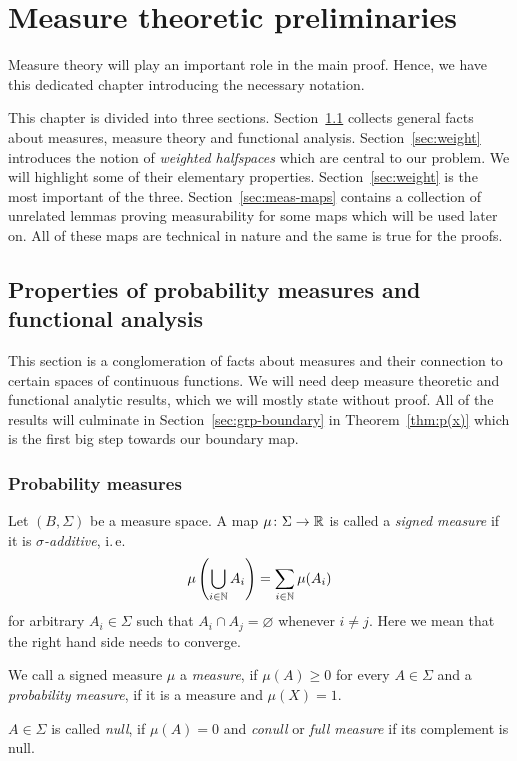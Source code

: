 \section{Measure theoretic preliminaries}
\label{sec:measure}

Measure theory will play an important role in the main proof. Hence, we have this dedicated chapter introducing the necessary notation.

This chapter is divided into three sections. Section~\ref{sec:prob} collects general facts about measures, measure theory and functional analysis.
Section~\ref{sec:weight} introduces the notion of \emph{weighted halfspaces} which are central to our problem. We will highlight some of their elementary properties. Section~\ref{sec:weight} is the most important of the three.
Section~\ref{sec:meas-maps} contains a collection of unrelated lemmas proving measurability for some maps which will be used later on. All of these maps are technical in nature and the same is true for the proofs.
\subsection{Properties of probability measures and functional analysis}
\label{sec:prob}

This section is a conglomeration of facts about measures and their connection to certain spaces of continuous functions. We will need deep measure theoretic and functional analytic results, which we will mostly state without proof. All of the results will culminate in Section~\ref{sec:grp-boundary} in Theorem~\ref{thm:p(x)} which is the first big step towards our boundary map.

\subsubsection*{Probability measures}
\label{sec:prob-measures}

\begin{defin}
  Let \((B, \Sigma)\) be a measure space. A map \(\mu \colon \Sigma \to \mathbb{R}\) is called a \emph{signed measure} if it is \emph{\(\sigma\)-additive}, i.\,e.
  \[
    \mu\left(\bigcup_{i \in \mathbb{N}}A_i \right) = \sum_{i \in \mathbb{N}} \mu(A_i)
  \]
  for arbitrary \(A_i \in \Sigma\) such that \(A_i \cap A_j = \varnothing\) whenever \(i \neq j\). Here we mean that the right hand side needs to converge.

  We call a signed measure \(\mu\) a \emph{measure}, if \(\mu(A) \geq 0\) for every \(A \in \Sigma\) and a \emph{probability measure}, if it is a measure and \(\mu(X) = 1\).

  \(A \in \Sigma\) is called \emph{null}, if \(\mu(A) = 0\) and \emph{conull} or \emph{full measure} if its complement is null.
\end{defin}


